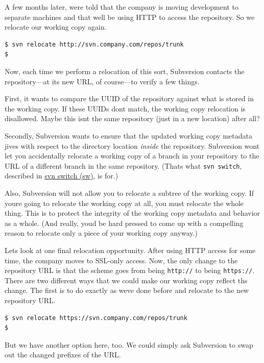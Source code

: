 A few months later, we\textquotesingle re told that the company is
moving development to separate machines and that we\textquotesingle ll
be using HTTP to access the repository. So we relocate our working copy
again.

\begin{verbatim}
$ svn relocate http://svn.company.com/repos/trunk
$
\end{verbatim}

Now, each time we perform a relocation of this sort, Subversion contacts
the repository---at its new URL, of course---to verify a few things.

First, it wants to compare the UUID of the repository against what is
stored in the working copy. If these UUIDs don\textquotesingle t match,
the working copy relocation is disallowed. Maybe this
isn\textquotesingle t the same repository (just in a new location) after
all?

Secondly, Subversion wants to ensure that the updated working copy
metadata jives with respect to the directory location \emph{inside} the
repository. Subversion won\textquotesingle t let you accidentally
relocate a working copy of a branch in your repository to the URL of a
different branch in the same repository. (That\textquotesingle s what
\texttt{svn\ switch}, described in \hyperref[svn.ref.svn.c.switch]{svn
switch (sw)}, is for.)

Also, Subversion will not allow you to relocate a subtree of the working
copy. If you\textquotesingle re going to relocate the working copy at
all, you must relocate the whole thing. This is to protect the integrity
of the working copy metadata and behavior as a whole. (And really,
you\textquotesingle d be hard pressed to come up with a compelling
reason to relocate only a piece of your working copy anyway.)

Let\textquotesingle s look at one final relocation opportunity. After
using HTTP access for some time, the company moves to SSL-only access.
Now, the only change to the repository URL is that the scheme goes from
being \texttt{http://} to being \texttt{https://}. There are two
different ways that we could make our working copy reflect ths change.
The first is to do exactly as we\textquotesingle ve done before and
relocate to the new repository URL.

\begin{verbatim}
$ svn relocate https://svn.company.com/repos/trunk
$
\end{verbatim}

But we have another option here, too. We could simply ask Subversion to
swap out the changed prefixes of the URL.

